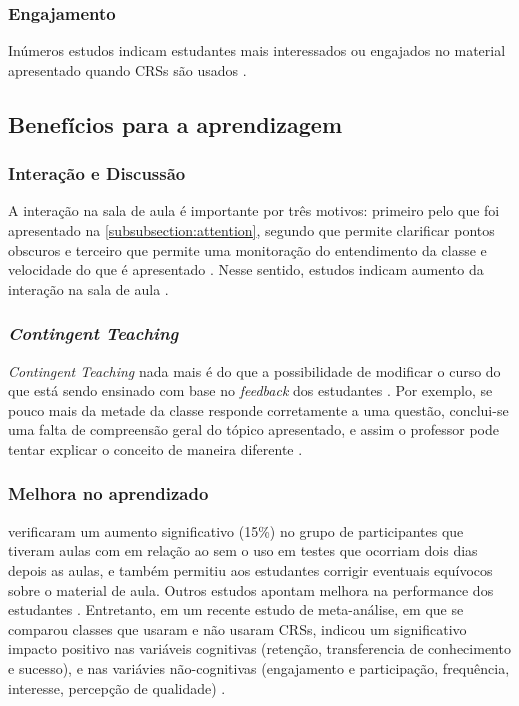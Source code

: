 \subsubsection{Engajamento}
Inúmeros estudos indicam estudantes mais interessados ou engajados no material
apresentado quando CRSs são usados
\cite{Kaya2016, Rana2016, Horne2015, Mattos2015, Moratelli2014, Kulatunga2014, Blood2013, Terrion2012,
Caldwell2007}.

\subsection{Benefícios para a aprendizagem}

\subsubsection{Interação e Discussão}
A interação na sala de aula é importante por três motivos: primeiro pelo que foi
apresentado na \autoref{subsubsection:attention}, segundo que permite clarificar
pontos obscuros e terceiro que permite uma monitoração do entendimento da classe
e velocidade do que é apresentado \cite{DInverno2003}. Nesse sentido, estudos
indicam aumento da interação na sala de aula \cite{Mattos2015, Barragues2011, Titman2011, Mayer2009, Caldwell2007}.

\subsubsection{\textit{Contingent Teaching}}\label{sussubsection:contingent}
\textit{Contingent Teaching} nada mais é do que a possibilidade de modificar
o curso do que está sendo ensinado com base no \textit{feedback} dos estudantes
\cite{Arnesen2013, Caldwell2007}. Por exemplo, se pouco mais da metade da classe
responde corretamente a uma questão, conclui-se uma falta de compreensão geral do
tópico apresentado, e assim o professor pode tentar explicar o conceito
de maneira diferente \cite{Terrion2012, Strasser2010}.

\subsubsection{Melhora no aprendizado}
 verificaram um aumento significativo (15\%) no grupo de
participantes que tiveram aulas com {\clickers} em relação ao sem o uso em testes que
ocorriam dois dias depois as aulas, e também permitiu aos estudantes corrigir
eventuais equívocos sobre o material de aula. Outros estudos apontam melhora
na performance dos estudantes \cite{Sun2014, Caldwell2007}. Entretanto, em um recente estudo de meta-análise,
em que se comparou classes que usaram e não usaram CRSs,
indicou um significativo impacto positivo nas variáveis cognitivas (retenção,
transferencia de conhecimento e sucesso), e nas variávies não-cognitivas (engajamento e participação, frequência, interesse,
percepção de qualidade) \cite{Hunsu2016}.

